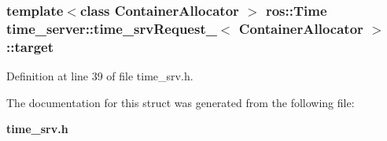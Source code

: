 \subsubsection[{target}]{\setlength{\rightskip}{0pt plus 5cm}template$<$class Container\-Allocator $>$ ros\-::\-Time {\bf time\-\_\-server\-::time\-\_\-srv\-Request\-\_\-}$<$ \-Container\-Allocator $>$\-::{\bf target}}\label{structtime__server_1_1time__srvRequest___adb95a7e997185dfce5b2fca89d53a302}


\-Definition at line 39 of file time\-\_\-srv.\-h.



\-The documentation for this struct was generated from the following file\-:\begin{DoxyCompactItemize}
\item 
{\bf time\-\_\-srv.\-h}\end{DoxyCompactItemize}
